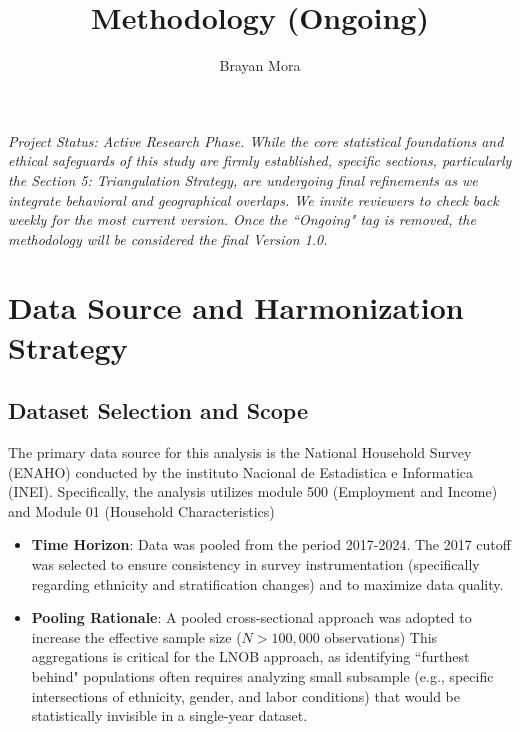 \documentclass{article}
\title{\textbf{Methodology (Ongoing)}}
\author{Brayan Mora}
\date{}
\begin{document}
\maketitle
\begin{center}
    \textit{Project Status: Active Research Phase.  While the core statistical 
    foundations and ethical safeguards of this study are firmly established, 
    specific sections, particularly the Section 5: Triangulation Strategy, are 
    undergoing final refinements as we integrate behavioral and geographical 
    overlaps. We invite reviewers to check back weekly for the most current version. 
    Once the ``Ongoing" tag is removed, the methodology will be considered the final 
    Version 1.0.}
\end{center}

\section{Data Source and Harmonization Strategy}

\subsection{Dataset Selection and Scope}
The primary data source for this analysis is the National Household Survey (ENAHO) conducted by the 
instituto Nacional de Estadistica e Informatica (INEI). Specifically, the analysis utilizes module 
500 (Employment and Income) and Module 01 (Household Characteristics)

\begin{itemize}

    \item \textbf{Time Horizon}: Data was pooled from the period 
    2017-2024. The 2017 cutoff was selected to ensure consistency 
    in survey instrumentation (specifically regarding ethnicity 
    and stratification changes) and to maximize data quality. 

    \item \textbf{Pooling Rationale}: A pooled cross-sectional 
    approach was adopted to increase the effective sample size 
    ($N > 100,000$ observations) This aggregations is critical 
    for the LNOB approach, as identifying ``furthest behind" 
    populations often requires analyzing small subsample 
    (e.g., specific intersections of ethnicity, gender, and 
    labor conditions) that would be statistically invisible 
    in a single-year dataset. 

\end{itemize}
\end{document}
